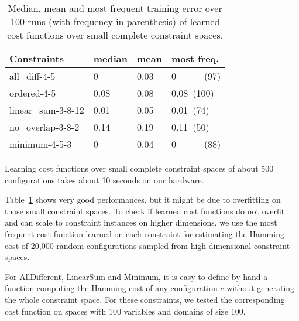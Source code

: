 \documentclass{article}
\begin{document}



\begin{table}
  \centering
\begin{tabular}{|l|l|l|l|}
  \hline
  Constraints & median & mean & most freq.\\
  \hline
  all\_diff-4-5 & 0 & 0.03 & 0~~~~~~(97)\\
  ordered-4-5 & 0.08 & 0.08 & 0.08~(100)\\
  linear\_sum-3-8-12 & 0.01 & 0.05 & 0.01~(74)\\
  no\_overlap-3-8-2 & 0.14 & 0.19 & 0.11~(50)\\
  minimum-4-5-3 & 0 & 0.04 & 0~~~~~~(88)\\
  \hline
\end{tabular}
\caption{Median, mean and  most frequent training error  over 100 runs
  (with frequency in parenthesis) of learned cost functions over small
  complete constraint spaces.}
\label{tab:cf_small}
\end{table}

Learning cost functions over small complete constraint spaces of about
500 configurations takes about 10 seconds on our hardware.

Table~\ref{tab:cf_small} shows very good performances, but it might be
due  to overfitting  on those  small constraint  spaces.  To  check if
learned  cost functions  do not  overfit and  can scale  to constraint
instances on higher dimensions, we use the most frequent cost function
learned on each  constraint for estimating the Hamming  cost of 20,000
random configurations sampled from high-dimensional constraint spaces.

For AllDifferent, LinearSum and Minimum, it  is easy to define by hand
a function computing the Hamming cost of any configuration $c$ without
generating  the  whole constraint  space.  For  these constraints,  we
tested the  corresponding cost function  on spaces with  100 variables
and domains of size 100.
\end{document}
